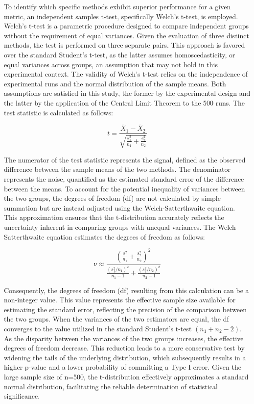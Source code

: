 To identify which specific methods exhibit superior performance for a given metric, an independent samples t-test, specifically Welch's t-test, is employed. 
Welch's t-test is a parametric procedure designed to compare independent groups without the requirement of equal variances. 
Given the evaluation of three distinct methods, the test is performed on three separate pairs. 
This approach is favored over the standard Student's t-test, as the latter assumes homoscedasticity, or equal variances across groups, an assumption that may not hold in this experimental context. 
The validity of Welch's t-test relies on the independence of experimental runs and the normal distribution of the sample means. 
Both assumptions are satisfied in this study, the former by the experimental design and the latter by the application of the Central Limit Theorem to the 500 runs. 
The test statistic is calculated as follows:

\begin{equation}
    t = \frac{\bar{X}_1 - \bar{X}_2}{\sqrt{\frac{s_1^2}{n_1} + \frac{s_2^2}{n_2}}}
\end{equation}

The numerator of the test statistic represents the signal, defined as the observed difference between the sample means of the two methods. 
The denominator represents the noise, quantified as the estimated standard error of the difference between the means. 
To account for the potential inequality of variances between the two groups, the degrees of freedom (df) are not calculated by simple summation but are instead adjusted using the Welch-Satterthwaite equation. 
This approximation ensures that the t-distribution accurately reflects the uncertainty inherent in comparing groups with unequal variances. 
The Welch-Satterthwaite equation estimates the degrees of freedom as follows:

\begin{equation}
    \nu \approx \frac{\left( \frac{s_1^2}{n_1} + \frac{s_2^2}{n_2} \right)^2}{\frac{(s_1^2 / n_1)^2}{n_1 - 1} + \frac{(s_2^2 / n_2)^2}{n_2 - 1}}
\end{equation}


Consequently, the degrees of freedom (df) resulting from this calculation can be a non-integer value. 
This value represents the effective sample size available for estimating the standard error, reflecting the precision of the comparison between the two groups. 
When the variances of the two estimators are equal, the df converges to the value utilized in the standard Student's t-test $(n_1+n_2-2)$. 
As the disparity between the variances of the two groups increases, the effective degrees of freedom decrease. 
This reduction leads to a more conservative test by widening the tails of the underlying distribution, which subsequently results in a higher p-value and a lower probability of committing a Type I error. 
Given the large sample size of n=500, the t-distribution effectively approximates a standard normal distribution, facilitating the reliable determination of statistical significance.




